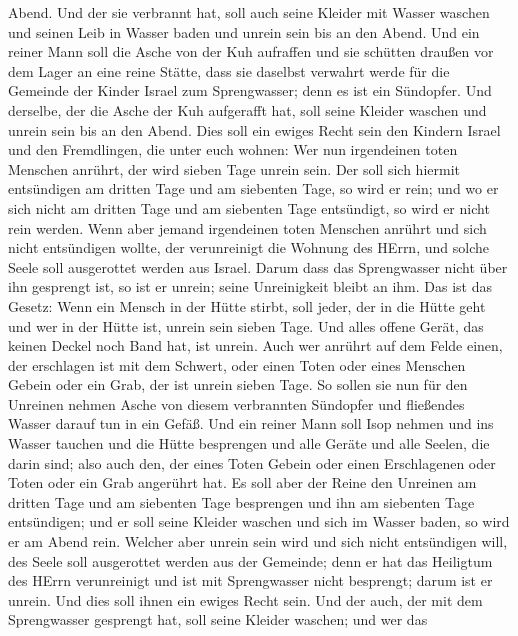 Abend.  Und der sie verbrannt hat, soll auch seine Kleider
mit Wasser waschen und seinen Leib in Wasser baden und unrein sein bis
an den Abend.  Und ein reiner Mann soll die Asche von der
Kuh aufraffen und sie schütten draußen vor dem Lager an eine reine
Stätte, dass sie daselbst verwahrt werde für die Gemeinde der Kinder
Israel zum Sprengwasser; denn es ist ein Sündopfer.  Und
derselbe, der die Asche der Kuh aufgerafft hat, soll seine Kleider
waschen und unrein sein bis an den Abend. Dies soll ein ewiges Recht
sein den Kindern Israel und den Fremdlingen, die unter euch wohnen:
 Wer nun irgendeinen toten Menschen anrührt, der wird
sieben Tage unrein sein.  Der soll sich hiermit entsündigen
am dritten Tage und am siebenten Tage, so wird er rein; und wo er sich
nicht am dritten Tage und am siebenten Tage entsündigt, so wird er nicht
rein werden.  Wenn aber jemand irgendeinen toten Menschen
anrührt und sich nicht entsündigen wollte, der verunreinigt die Wohnung
des HErrn, und solche Seele soll ausgerottet werden aus Israel. Darum
dass das Sprengwasser nicht über ihn gesprengt ist, so ist er unrein;
seine Unreinigkeit bleibt an ihm.  Das ist das Gesetz: Wenn
ein Mensch in der Hütte stirbt, soll jeder, der in die Hütte geht und
wer in der Hütte ist, unrein sein sieben Tage.  Und alles
offene Gerät, das keinen Deckel noch Band hat, ist unrein. 
Auch wer anrührt auf dem Felde einen, der erschlagen ist mit dem
Schwert, oder einen Toten oder eines Menschen Gebein oder ein Grab, der
ist unrein sieben Tage.  So sollen sie nun für den Unreinen
nehmen Asche von diesem verbrannten Sündopfer und fließendes Wasser
darauf tun in ein Gefäß.  Und ein reiner Mann soll Isop
nehmen und ins Wasser tauchen und die Hütte besprengen und alle Geräte
und alle Seelen, die darin sind; also auch den, der eines Toten Gebein
oder einen Erschlagenen oder Toten oder ein Grab angerührt hat.
 Es soll aber der Reine den Unreinen am dritten Tage und am
siebenten Tage besprengen und ihn am siebenten Tage entsündigen; und er
soll seine Kleider waschen und sich im Wasser baden, so wird er am Abend
rein.  Welcher aber unrein sein wird und sich nicht
entsündigen will, des Seele soll ausgerottet werden aus der Gemeinde;
denn er hat das Heiligtum des HErrn verunreinigt und ist mit
Sprengwasser nicht besprengt; darum ist er unrein.  Und
dies soll ihnen ein ewiges Recht sein. Und der auch, der mit dem
Sprengwasser gesprengt hat, soll seine Kleider waschen; und wer das
